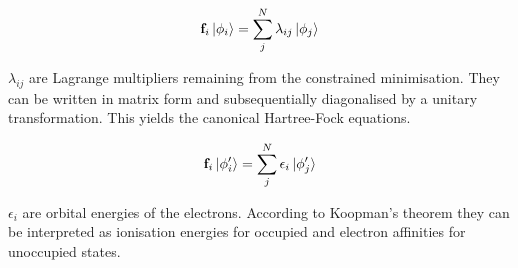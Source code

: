 \begin{align}
	\mathbf{f}_i\ket{\phi_i}=\sum_j^N\lambda_{ij}\ket{\phi_j}
\end{align}

$\lambda_{ij}$ are Lagrange multipliers remaining from the constrained
minimisation. They can be written in matrix form and subsequentially
diagonalised by a unitary transformation. This yields the canonical
Hartree-Fock equations.

\begin{align}
	\mathbf{f}_i\ket{\phi'_i}=\sum_j^N\epsilon_i\ket{\phi'_j}
\end{align}

$\epsilon_i$ are orbital energies of the electrons. According to Koopman's
theorem they can be interpreted as ionisation energies for occupied and
electron affinities for unoccupied states.
